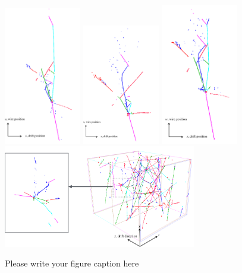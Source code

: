 \begin{figure}
\includegraphics[width=0.3\textwidth]{Figures/EventDisplays/MC/ReconstructionU.pdf}
\includegraphics[width=0.3\textwidth]{Figures/EventDisplays/MC/ReconstructionV.pdf}
\includegraphics[width=0.3\textwidth]{Figures/EventDisplays/MC/ReconstructionW.pdf} \\
\includegraphics[width=0.75\textwidth]{Figures/EventDisplays/MC/Reconstruction.pdf} 
\caption{Please write your figure caption here}
\label{fig:1a}
\end{figure}

